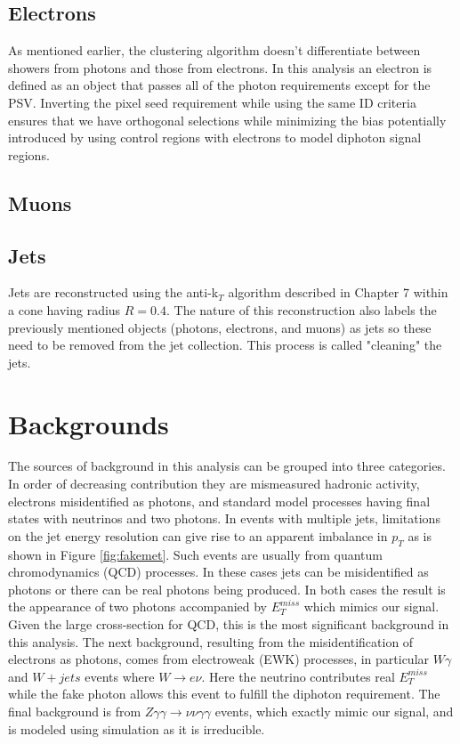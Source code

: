 \label{section:photondefinition}

\subsection{Electrons}
As mentioned earlier, the clustering algorithm doesn't differentiate between showers from photons and those from electrons.  In this analysis an electron is defined as an object that passes all of the photon requirements except for the PSV.  Inverting the pixel seed requirement while using the same ID criteria ensures that we have orthogonal selections while minimizing the bias potentially introduced by using control regions with electrons to model diphoton signal regions. 


\subsection{Muons}

\subsection{Jets}
Jets are reconstructed using the anti-k$_T$ algorithm described in Chapter 7 within a cone having radius $R = 0.4$.  The nature of this reconstruction also labels the previously mentioned objects (photons, electrons, and muons) as jets so these need to be removed from the jet collection.  This process is called "cleaning" the jets. 
\label{section:jetdefinition}
\section{Backgrounds}
The sources of background in this analysis can be grouped into three categories.  In order of decreasing contribution they are mismeasured hadronic activity, electrons misidentified as photons, and standard model processes having final states with neutrinos and two photons.  In events with multiple jets, limitations on the jet energy resolution can give rise to an apparent imbalance in $p_T$ as is shown in Figure \ref{fig:fakemet}.  Such events are usually from quantum chromodynamics (QCD) processes.  In these cases jets can be misidentified as photons or there can be real photons being produced.  In both cases the result is the appearance of two photons accompanied by $E^{miss}_T$ which mimics our signal.  Given the large cross-section for QCD, this is the most significant background in this analysis.  The next background, resulting from the misidentification of electrons as photons, comes from electroweak (EWK) processes, in particular $W\gamma$ and $W + jets$ events where $W \rightarrow e\nu$.  Here the neutrino contributes real $E^{miss}_T$ while the fake photon allows this event to fulfill the diphoton requirement.  The final background is from $Z\gamma \gamma \rightarrow \nu \nu \gamma \gamma$ events, which exactly mimic our signal, and is modeled using simulation as it is irreducible.


